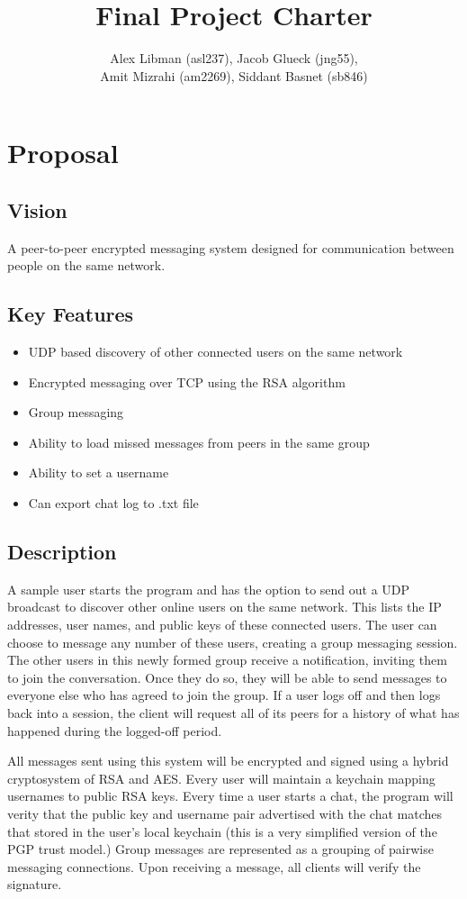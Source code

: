 \documentclass[a4paper]{article}
\title{Final Project Charter}
\author{Alex Libman (asl237), Jacob Glueck (jng55), \\Amit Mizrahi (am2269), Siddant Basnet (sb846)}
\date{}
\begin{document}
\maketitle

\section{Proposal}
\subsection{Vision}
A peer-to-peer encrypted messaging system designed for communication between people on the same network.

\subsection{Key Features}
\begin{itemize}
	\item UDP based discovery of other connected users on the same network 
	\item Encrypted messaging over TCP using the RSA algorithm
	\item Group messaging
	\item Ability to load missed messages from peers in the same group
	\item Ability to set a username
	\item Can export chat log to .txt file
\end{itemize}

\subsection{Description}
A sample user starts the program and has the option to send out a UDP broadcast to discover other online users on the same network. This lists the IP addresses, user names, and public keys of these connected users. The user can choose to message any number of these users, creating a group messaging session. The other users in this newly formed group receive a notification, inviting them to join the conversation. Once they do so, they will be able to send messages to everyone else who has agreed to join the group. If a user logs off and then logs back into a session, the client will request all of its peers for a history of what has happened during the logged-off period.

All messages sent using this system will be encrypted and signed using a hybrid cryptosystem of RSA and AES. Every user will maintain a keychain mapping usernames to public RSA keys. Every time a user starts a chat, the program will verity that the public key and username pair advertised with the chat matches that stored in the user's local keychain (this is a very simplified version of the PGP trust model.) Group messages are represented as a grouping of pairwise messaging connections. Upon receiving a message, all clients will verify the signature.
\end{document}
